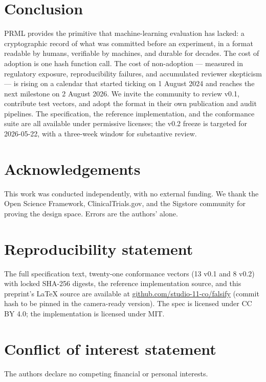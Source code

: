 \documentclass[11pt, a4paper]{article}
\begin{document}
\section{Conclusion}
\label{sec:conclusion}

PRML provides the primitive that machine-learning evaluation has lacked: a cryptographic record of what was committed before an experiment, in a format readable by humans, verifiable by machines, and durable for decades. The cost of adoption is one hash function call. The cost of non-adoption --- measured in regulatory exposure, reproducibility failures, and accumulated reviewer skepticism --- is rising on a calendar that started ticking on 1 August 2024 and reaches the next milestone on 2 August 2026. We invite the community to review v0.1, contribute test vectors, and adopt the format in their own publication and audit pipelines. The specification, the reference implementation, and the conformance suite are all available under permissive licenses; the v0.2 freeze is targeted for 2026-05-22, with a three-week window for substantive review.

\section*{Acknowledgements}

This work was conducted independently, with no external funding. We thank the Open Science Framework, ClinicalTrials.gov, and the Sigstore community for proving the design space. Errors are the authors' alone.

\section*{Reproducibility statement}

The full specification text, twenty-one conformance vectors (13 v0.1 and 8 v0.2) with locked SHA-256 digests, the reference implementation source, and this preprint's \LaTeX{} source are available at \href{https://github.com/studio-11-co/falsify}{github.com/studio-11-co/falsify} (commit hash to be pinned in the camera-ready version). The spec is licensed under CC BY 4.0; the implementation is licensed under MIT.

\section*{Conflict of interest statement}

The authors declare no competing financial or personal interests.
\end{document}
